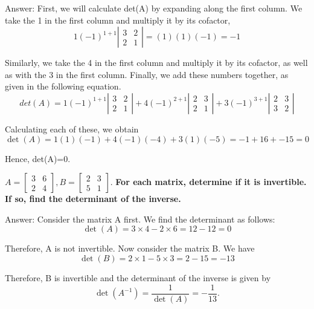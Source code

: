 \documentclass{article}
\begin{document}
\begin{description}[style=nextline]
Answer: First, we will calculate det(A) by expanding along the first column. We take the 1 in the first column and multiply it by its cofactor,
$$1 \left( -1\right) ^{1+1}\left| \begin{array}{rr} 3 & 2 \\ 2 & 1 \end{array} \right| = (1)(1)(-1) = -1$$

Similarly, we take the 4 in the first column and multiply it by its cofactor, as well as with the 3 in the first column. Finally, we add these numbers together, as given in the following equation.
$$det(A) = 1 \left( -1\right) ^{1+1}\left| \begin{array}{rr} 3 & 2 \\ 2 & 1 \end{array} \right| + 4 \left( -1\right) ^{2+1}\left| \begin{array}{rr} 2 & 3 \\ 2 & 1 \end{array} \right| + 3 \left( -1\right) ^{3+1}\left| \begin{array}{rr} 2 & 3 \\ 3 & 2 \end{array} \right|$$

Calculating each of these, we obtain
$$\det \left(A\right) = 1 \left(1\right)\left(-1\right) + 4 \left(-1\right)\left(-4\right) + 3 \left(1\right)\left(-5\right) = -1 + 16 + -15 = 0$$

Hence, det(A)=0.

\item[Question 17: Let]
$A = \left[ \begin{array}{rr} 3 & 6 \\ 2 & 4 \end{array} \right], B = \left[ \begin{array}{rr} 2 & 3 \\ 5 & 1 \end{array} \right]$. \textbf{For each matrix, determine if it is invertible. If so, find the determinant of the inverse.}

Answer: Consider the matrix A first. We find the determinant as follows:
$$\det \left( A \right) = 3 \times 4 - 2 \times 6 = 12 - 12 = 0$$

Therefore, A is not invertible.
Now consider the matrix B. We have
$$\det \left( B \right) = 2 \times 1 - 5 \times 3 = 2 - 15 = -13$$

Therefore, B is invertible and the determinant of the inverse is given by
$$\det \left( A^{-1} \right) = \frac{1}{\det(A)} = -\frac{1}{13}.$$


\end{description}
\end{document}
